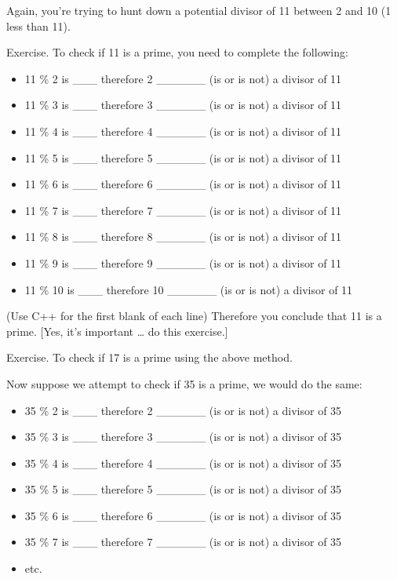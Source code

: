 \documentclass[
]{article}
\providecommand{\tightlist}{%
  \setlength{\itemsep}{0pt}\setlength{\parskip}{0pt}}
\begin{document}
Again, you're trying to hunt down a potential divisor of 11 between 2
and 10 (1 less than 11).

Exercise. To check if 11 is a prime, you need to complete the following:

\begin{itemize}
\tightlist
\item
  11 \% 2 is \_\_\_ therefore 2 \_\_\_\_\_\_ (is or is not) a divisor of
  11
\item
  11 \% 3 is \_\_\_ therefore 3 \_\_\_\_\_\_ (is or is not) a divisor of
  11
\item
  11 \% 4 is \_\_\_ therefore 4 \_\_\_\_\_\_ (is or is not) a divisor of
  11
\item
  11 \% 5 is \_\_\_ therefore 5 \_\_\_\_\_\_ (is or is not) a divisor of
  11
\item
  11 \% 6 is \_\_\_ therefore 6 \_\_\_\_\_\_ (is or is not) a divisor of
  11
\item
  11 \% 7 is \_\_\_ therefore 7 \_\_\_\_\_\_ (is or is not) a divisor of
  11
\item
  11 \% 8 is \_\_\_ therefore 8 \_\_\_\_\_\_ (is or is not) a divisor of
  11
\item
  11 \% 9 is \_\_\_ therefore 9 \_\_\_\_\_\_ (is or is not) a divisor of
  11
\item
  11 \% 10 is \_\_\_ therefore 10 \_\_\_\_\_\_ (is or is not) a divisor
  of 11
\end{itemize}

(Use C++ for the first blank of each line) Therefore you conclude that
11 is a prime. {[}Yes, it's important \ldots{} do this exercise.{]}

Exercise. To check if 17 is a prime using the above method.

Now suppose we attempt to check if 35 is a prime, we would do the same:

\begin{itemize}
\tightlist
\item
  35 \% 2 is \_\_\_ therefore 2 \_\_\_\_\_\_ (is or is not) a divisor of
  35
\item
  35 \% 3 is \_\_\_ therefore 3 \_\_\_\_\_\_ (is or is not) a divisor of
  35
\item
  35 \% 4 is \_\_\_ therefore 4 \_\_\_\_\_\_ (is or is not) a divisor of
  35
\item
  35 \% 5 is \_\_\_ therefore 5 \_\_\_\_\_\_ (is or is not) a divisor of
  35
\item
  35 \% 6 is \_\_\_ therefore 6 \_\_\_\_\_\_ (is or is not) a divisor of
  35
\item
  35 \% 7 is \_\_\_ therefore 7 \_\_\_\_\_\_ (is or is not) a divisor of
  35
\item
  etc.
\end{itemize}
\end{document}
